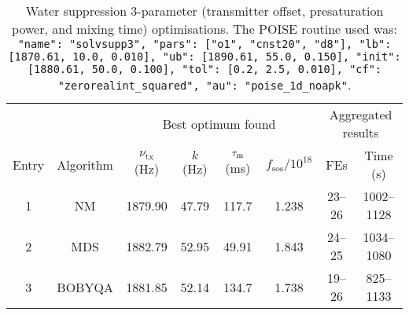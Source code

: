 \begin{table}
    \centering
    \begin{tabular}{cccccccc}
        \toprule
              &           & \multicolumn{4}{c}{Best optimum found} & \multicolumn{2}{c}{Aggregated results} \\
                            \cmidrule(lr){3-6}                       \cmidrule(lr){7-8}
        Entry & Algorithm & $\nu_\text{tx}$ (\si{\Hz}) & $k$ (\si{\Hz}) & $\tau_\mathrm{m}$ (\si{\ms}) & $f_\text{sos} / 10^{18}$ & FEs    & Time (\si{\s}) \\
        \midrule
        1     & NM        & 1879.90                    & 47.79          & 117.7              & 1.238                    & 23--26 & 1002--1128     \\
        2     & MDS       & 1882.79                    & 52.95          & 49.91              & 1.843                    & 24--25 & 1034--1080     \\
        3     & BOBYQA    & 1881.85                    & 52.14          & 134.7              & 1.738                    & 19--26 & 825--1133      \\
        \bottomrule
    \end{tabular}
    \caption{
        Water suppression 3-parameter (transmitter offset, presaturation power, and mixing time) optimisations.
        The POISE routine used was: \texttt{{"name": "solvsupp3", "pars": ["o1", "cnst20", "d8"], "lb": [1870.61, 10.0, 0.010], "ub": [1890.61, 55.0, 0.150], "init": [1880.61, 50.0, 0.100], "tol": [0.2, 2.5, 0.010], "cf": "zerorealint_squared", "au": "poise_1d_noapk"}}.
    }
    \label{tbl:poise_solvsupp3p}
\end{table}

